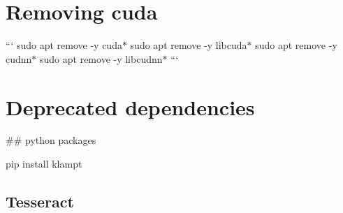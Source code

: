 \section*{Removing cuda}

``` sudo apt remove -\/y \textquotesingle{}cuda$\ast$\textquotesingle{} sudo apt remove -\/y \textquotesingle{}libcuda$\ast$\textquotesingle{} sudo apt remove -\/y \textquotesingle{}cudnn$\ast$\textquotesingle{} sudo apt remove -\/y \textquotesingle{}libcudnn$\ast$\textquotesingle{} ```

\section*{Deprecated dependencies}

\#\# python packages 
\begin{DoxyCode}
pip install klampt
\end{DoxyCode}


\subsection*{Tesseract}


